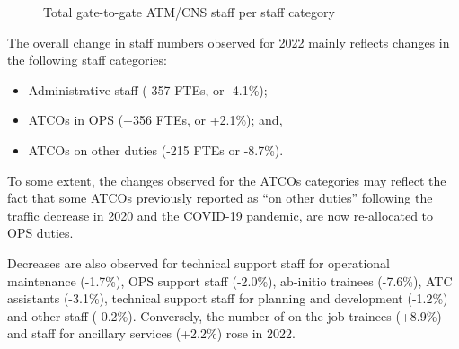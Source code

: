 \documentclass[
  letterpaper,
  DIV=11,
  numbers=noendperiod]{scrreprt}
\providecommand{\tightlist}{%
  \setlength{\itemsep}{0pt}\setlength{\parskip}{0pt}}\usepackage{longtable,booktabs,array}
\begin{document}
\begin{figure}


\caption{\label{fig-figure-2-7-2}Total gate-to-gate ATM/CNS staff per
staff category}

\end{figure}%

The overall change in staff numbers observed for 2022 mainly reflects
changes in the following staff categories:

\begin{itemize}
\tightlist
\item
  Administrative staff (-357 FTEs, or -4.1\%);
\item
  ATCOs in OPS (+356 FTEs, or +2.1\%); and,
\item
  ATCOs on other duties (-215 FTEs or -8.7\%).
\end{itemize}

To some extent, the changes observed for the ATCOs categories may
reflect the fact that some ATCOs previously reported as ``on other
duties'' following the traffic decrease in 2020 and the COVID-19
pandemic, are now re-allocated to OPS duties.

Decreases are also observed for technical support staff for operational
maintenance (-1.7\%), OPS support staff (-2.0\%), ab-initio trainees
(-7.6\%), ATC assistants (-3.1\%), technical support staff for planning
and development (-1.2\%) and other staff (-0.2\%). Conversely, the
number of on-the job trainees (+8.9\%) and staff for ancillary services
(+2.2\%) rose in 2022.
\end{document}
